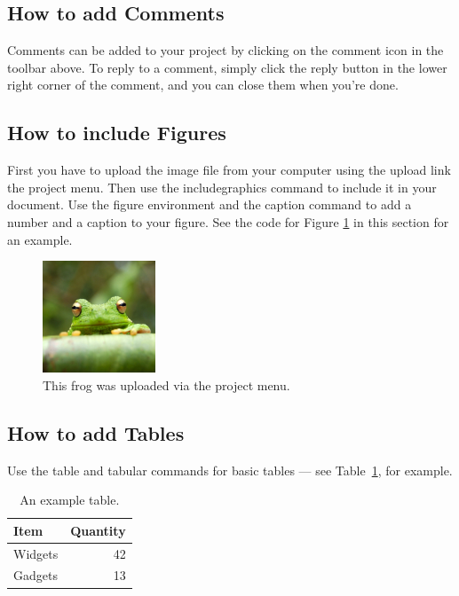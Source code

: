 \documentclass[a4paper]{article}
\begin{document}
\subsection{How to add Comments}

Comments can be added to your project by clicking on the comment icon in the toolbar above. %
%
%
To reply to a comment, simply click the reply button in the lower right corner of the comment, and you can close them when you're done.

\subsection{How to include Figures}

First you have to upload the image file from your computer using the upload link the project menu. Then use the includegraphics command to include it in your document. Use the figure environment and the caption command to add a number and a caption to your figure. See the code for Figure \ref{fig:frog} in this section for an example.

\begin{figure}
\centering
\includegraphics[width=0.3\textwidth]{frog.jpg}
\caption{\label{fig:frog}This frog was uploaded via the project menu.}
\end{figure}

\subsection{How to add Tables}

Use the table and tabular commands for basic tables --- see Table~\ref{tab:widgets}, for example. 

\begin{table}
\centering
\begin{tabular}{l|r}
Item & Quantity \\\hline
Widgets & 42 \\
Gadgets & 13
\end{tabular}
\caption{\label{tab:widgets}An example table.}
\end{table}
\end{document}
